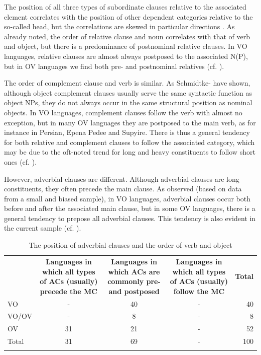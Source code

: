 \documentclass[output=paper]{langsci/langscibook}
\begin{document}
The position of all three types of subordinate clauses relative to the associated element correlates with the position of other dependent categories relative to the so-called head, but the correlations are skewed in particular directions \citep{Diessel2001}. As \citet{Greenberg1963} already noted, the order of relative clause and noun correlates with that of verb and object, but there is a predominance of postnominal relative clauses. In VO languages, relative clauses are almost always postposed to the associated N(P), but in OV languages we find both pre- and postnominal relatives (cf. \citealt{Dryer2005}). 

The order of complement clause and verb is similar. As Schmidtke-\citet{BodeDiessel2017} have shown, although object complement clauses usually serve the same syntactic function as object NPs, they do not always occur in the same structural position as nominal objects. In VO languages, complement clauses follow the verb with almost no exception, but in many OV languages they are postposed to the main verb, as for instance in Persian, Epena Pedee and Supyire. There is thus a general tendency for both relative and complement clauses to follow the associated category, which may be due to the oft-noted trend for long and heavy constituents to follow short ones (cf. \citealt{Behaghel1932}).

However, adverbial clauses are different. Although adverbial clauses are long constituents, they often precede the main clause. As \citet{Diessel2001} observed (based on data from a small and biased sample), in VO languages, adverbial clauses occur both before and after the associated main clause, but in some OV languages, there is a general tendency to prepose all adverbial clauses. This tendency is also evident in the current sample (cf. ).

\begin{table}
\begin{tabularx}{\textwidth}{XSSSr}
\lsptoprule
& \bfseries Languages in which all types of ACs (usually) precede the MC & \bfseries Languages in which ACs are commonly pre- and postposed & \bfseries Languages in which all types of ACs (usually) follow the MC & \bfseries Total\\
VO & - & 40 & - & 40\\
VO/OV & - & 8 & - & 8\\
OV & 31 & 21 & - & 52\\
Total & 31 & 69 & - & 100\\
\lspbottomrule
\end{tabularx}

\caption{The position of adverbial clauses and the order of verb and object}
\label{tab:diessel:1}
\end{table}
\end{document}
